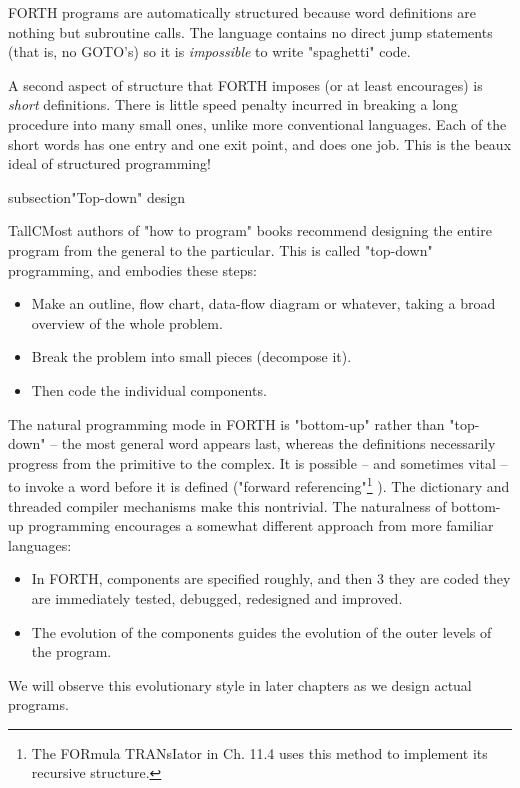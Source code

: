 FORTH programs are automatically structured because word definitions are nothing but subroutine calls. The language contains no direct jump statements (that is, no GOTO's) so it is \textit{impossible} to write "spaghetti" code.

A second aspect of structure that FORTH imposes (or at least encourages) is \textit{short} definitions. There is little speed penalty incurred in breaking a long procedure into many small ones, unlike more conventional languages. Each of the short words has one entry and one exit point, and does one job. This is the beaux ideal of structured programming!

subsection{"Top-down" design}

TallC{M}{ost} authors of "how to program" books recommend designing the entire program from the general to the particular. This is called "top-down" programming, and embodies these steps:

\begin{itemize}
    \item Make an outline, ﬂow chart, data-ﬂow diagram or whatever, taking a broad overview of the whole problem.
    \item Break the problem into small pieces (decompose it).
    \item Then code the individual components.
\end{itemize}

The natural programming mode in FORTH is "bottom-up" rather than "top-down" -- the most general word appears last, whereas the definitions necessarily progress from the primitive to the complex. It is possible -- and sometimes vital -- to invoke a word before it is defined ("forward referencing"\footnote{The FORmula TRANsIator in Ch. 11.4 uses this method to implement its recursive structure.} ). The dictionary and threaded compiler mechanisms make this nontrivial. The naturalness of bottom-up programming encourages a somewhat different approach from more familiar languages:

\begin{itemize}
    \item In FORTH, components are specified roughly, and then 3 they are coded they are immediately tested, debugged, redesigned and improved.
    \item The evolution of the components guides the evolution of the outer levels of the program.
\end{itemize}

We will observe this evolutionary style in later chapters as we design actual programs.

